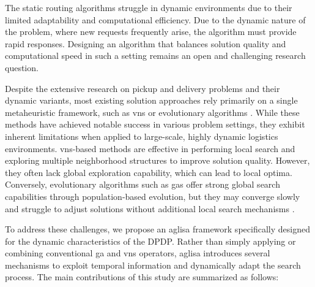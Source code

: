 \documentclass[pdflatex]{sn-jnl}
\begin{document}
The static routing algorithms struggle in dynamic environments due to their limited adaptability and computational efficiency. Due to the dynamic nature of the problem, where new requests frequently arise, the algorithm must provide rapid responses. Designing an algorithm that balances solution quality and computational speed in such a setting remains an open and challenging research question.

Despite the extensive research on pickup and delivery problems and their dynamic variants, most existing solution approaches rely primarily on a single metaheuristic framework, such as \gls{vns} or evolutionary algorithms \cite{horvath2025recent, voigt2025review}. While these methods have achieved notable success in various problem settings, they exhibit inherent limitations when applied to large-scale, highly dynamic logistics environments. \gls{vns}-based methods are effective in performing local search and exploring multiple neighborhood structures to improve solution quality. However, they often lack global exploration capability, which can lead to local optima. Conversely, evolutionary algorithms such as \gls{gas} offer strong global search capabilities through population-based evolution, but they may converge slowly and struggle to adjust solutions without additional local search mechanisms \cite{cai2024decomposition, wang2024hybrid}.

To address these challenges, we propose an \gls{aglisa} framework specifically designed for the dynamic 
characteristics of the DPDP. Rather than simply applying or combining conventional \gls{ga} and \gls{vns} operators, \gls{aglisa} introduces several mechanisms to exploit temporal information and dynamically adapt the search process. 
The main contributions of this study are summarized as follows:
\end{document}
